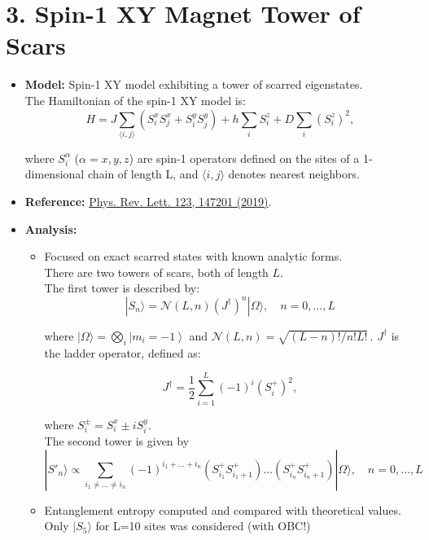 \documentclass[11pt]{article}
\begin{document}
\section*{3. Spin-1 XY Magnet Tower of Scars}
\begin{itemize}
    \item \textbf{Model:} Spin-1 XY model exhibiting a tower of scarred eigenstates.\\
    The Hamiltonian of the spin-1 XY model is:
	\begin{equation}
	H = J \sum_{\langle i,j \rangle} \left( S^x_i S^x_j + S^y_i S^y_j \right) 
	+ h \sum_i S^z_i + D \sum_i \left(S^z_i\right)^2,
	\end{equation}
	
	where $S^\alpha_i$ ($\alpha = x, y, z$) are spin-1 operators defined on the sites of a 1-dimensional chain of length L, and $\langle i,j \rangle$ denotes nearest neighbors.  

	
    \item \textbf{Reference:} \href{https://journals.aps.org/prl/pdf/10.1103/PhysRevLett.123.147201}{Phys. Rev. Lett. 123, 147201 (2019)}.
    \item \textbf{Analysis:}
    \begin{itemize}
        \item Focused on exact scarred states with known analytic forms.\\ There are two towers of scars, both of length $L$.\\
    The first tower is described by:
	    \begin{equation}
	|S_n\rangle = \mathcal{N}(L, n) \left(J^\dagger\right)^n |\Omega\rangle, \quad n = 0,\hdots,L
	\end{equation}
	
	where $|\Omega\rangle = \bigotimes_i \left| m_i = -1 \right\rangle$ and $\mathcal{N}(L, n) = \sqrt{(L-n)!/n!L!}\,$. $J^\dagger$ is the ladder operator, defined as:
	
	\begin{equation}
	J^\dagger = \frac{1}{2}\sum_{i=1}^{L} (-1)^i \left(S^+_i\right)^2, 
	\end{equation}
	
	where $S_i^\pm = S_i^x \pm i S_i^y$.\\
     The second tower is given by 
     \begin{equation}
	|S'_n\rangle \propto \sum_{i_1 \neq \hdots \neq i_n} (-1)^{i_1 + \hdots + i_n} \left(S^+_{i_1}S^+_{i_1+1}\right)\hdots\left(S^+_{i_n}S^+_{i_n+1}\right)  |\Omega\rangle, \quad n = 0,\hdots,L
	\end{equation}
        \item Entanglement entropy computed and compared with theoretical values.
        Only $|S_5\rangle$ for L=10 sites was considered (with OBC!)
        

\end{itemize}
\end{itemize}
\end{document}
